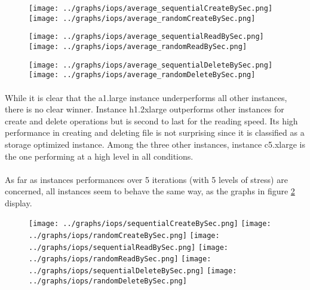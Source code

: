 \documentclass[11pt]{article}
\begin{document}
		\begin{center}
			\begin{figure}
				 \label{fig:iops_avg_tests_results}
				\texttt{[image: ../graphs/iops/average\_sequentialCreateBySec.png]}
				\texttt{[image: ../graphs/iops/average\_randomCreateBySec.png]}
				
				\texttt{[image: ../graphs/iops/average\_sequentialReadBySec.png]}
				\texttt{[image: ../graphs/iops/average\_randomReadBySec.png]}
				
				\texttt{[image: ../graphs/iops/average\_sequentialDeleteBySec.png]}
				\texttt{[image: ../graphs/iops/average\_randomDeleteBySec.png]}
			\end{figure}
		\end{center}

		\paragraph{} While it is clear that the a1.large instance underperforms
		all other instances, there is no clear winner. Instance h1.2xlarge
		outperforms other instances for create and delete operations but is
		second to last for the reading speed. Its high performance in creating
		and deleting file is not surprising since it is classified as a storage
		optimized instance. Among the three other instances, instance c5.xlarge
		is the one performing at a high level in all conditions.

		\paragraph{} As far as instances performances over 5 iterations (with 5
		levels of stress) are concerned, all instances seem to behave the same way, as the
		graphs in figure \ref{fig:iops_variation_tests_results} display.

		\begin{center}
			\begin{figure} 
				 \label{fig:iops_variation_tests_results}
				\texttt{[image: ../graphs/iops/sequentialCreateBySec.png]}
				\texttt{[image: ../graphs/iops/randomCreateBySec.png]}
				\texttt{[image: ../graphs/iops/sequentialReadBySec.png]}
				\texttt{[image: ../graphs/iops/randomReadBySec.png]}
				\texttt{[image: ../graphs/iops/sequentialDeleteBySec.png]}
				\texttt{[image: ../graphs/iops/randomDeleteBySec.png]}
			\end{figure}
		\end{center}
		
\end{document}
